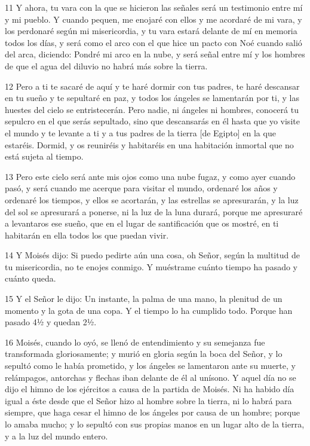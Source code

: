 \par 11 Y ahora, tu vara con la que se hicieron las señales será un testimonio entre mí y mi pueblo. Y cuando pequen, me enojaré con ellos y me acordaré de mi vara, y los perdonaré según mi misericordia, y tu vara estará delante de mí en memoria todos los días, y será como el arco con el que hice un pacto con Noé cuando salió del arca, diciendo: Pondré mi arco en la nube, y será señal entre mí y los hombres de que el agua del diluvio no habrá más sobre la tierra.

\par 12 Pero a ti te sacaré de aquí y te haré dormir con tus padres, te haré descansar en tu sueño y te sepultaré en paz, y todos los ángeles se lamentarán por ti, y las huestes del cielo se entristecerán. Pero nadie, ni ángeles ni hombres, conocerá tu sepulcro en el que serás sepultado, sino que descansarás en él hasta que yo visite el mundo y te levante a ti y a tus padres de la tierra [de Egipto] en la que estaréis. Dormid, y os reuniréis y habitaréis en una habitación inmortal que no está sujeta al tiempo.

\par 13 Pero este cielo será ante mis ojos como una nube fugaz, y como ayer cuando pasó, y será cuando me acerque para visitar el mundo, ordenaré los años y ordenaré los tiempos, y ellos se acortarán, y las estrellas se apresurarán, y la luz del sol se apresurará a ponerse, ni la luz de la luna durará, porque me apresuraré a levantaros ese sueño, que en el lugar de santificación que os mostré, en ti habitarán en ella todos los que puedan vivir.

\par 14 Y Moisés dijo: Si puedo pedirte aún una cosa, oh Señor, según la multitud de tu misericordia, no te enojes conmigo. Y muéstrame cuánto tiempo ha pasado y cuánto queda.

\par 15 Y el Señor le dijo: Un instante, la palma de una mano, la plenitud de un momento y la gota de una copa. Y el tiempo lo ha cumplido todo. Porque han pasado 4½ y quedan 2½.

\par 16 Moisés, cuando lo oyó, se llenó de entendimiento y su semejanza fue transformada gloriosamente; y murió en gloria según la boca del Señor, y lo sepultó como le había prometido, y los ángeles se lamentaron ante su muerte, y relámpagos, antorchas y flechas iban delante de él al unísono. Y aquel día no se dijo el himno de los ejércitos a causa de la partida de Moisés. Ni ha habido día igual a éste desde que el Señor hizo al hombre sobre la tierra, ni lo habrá para siempre, que haga cesar el himno de los ángeles por causa de un hombre; porque lo amaba mucho; y lo sepultó con sus propias manos en un lugar alto de la tierra, y a la luz del mundo entero.

